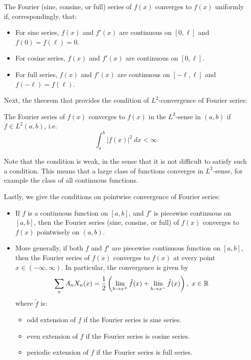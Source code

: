 \medskip 

\begin{thm} 
    The Fourier (sine, consine, or full) series of $f(x)$ converges to $f(x)$ uniformly if, correspondingly, that:
    \begin{itemize}
        \item For sine series, $f(x)$ and $f'(x)$ are continuous on $[0,\ell]$ and $f(0)= f(\ell)=0$.
        \item For cosine series, $f(x)$ and $f'(x)$ are continuous on $[0,\ell]$.
        \item For full series, $f(x)$ and $f'(x)$ are continuous on $[-\ell, \ell]$ and $f(-\ell) = f(\ell)$.
    \end{itemize}
\end{thm}

Next, the theorem that provides the condition of $L^2$-convergence of Fourier series:

\medskip 

\begin{thm} 
    The Fourier series of $f(x)$ converges to $f(x)$ in the $L^2$-sense in $(a,b)$ if $f\in L^2(a,b)$, i.e.
    \[\int_{a}^{b} |f(x)|^2\ dx < \infty\]
\end{thm}
Note that the condition is weak, in the sense that it is not difficult to satisfy such a condition. This means that a large class of functions converges in $L^2$-sense, for example the class of all continuous functions. 

Lastly, we give the conditions on pointwise convergence of Fourier series:

\medskip 

\begin{thm}  \hfill 
    \begin{itemize}
        \item If $f$ is a continuous function on $[a,b]$, and $f'$ is piecewise continuous on $[a,b]$, then the Fourier series (sine, consine, or full) of $f(x)$ converges to $f(x)$ pointwisely on $(a,b)$.
        \item More generally, if both $f$ and $f'$ are piecewise continuous function on $[a,b]$, then the Fourier series of $f(x)$ converges to $f(x)$ at every point $x\in (-\infty, \infty)$. In particular, the convergence is given by 
            \[\sum_n A_nX_n(x) = \frac{1}{2}\left(\lim_{h\to x^+}\tilde f(x) + \lim_{h\to x^-}\tilde f(x)\right),\ x\in {\mathbb R}\]
        where $\tilde f$ is:
        \begin{itemize}
            \item odd extension of $f$ if the Fourier series is sine series.
            \item even extension of $f$ if the Fourier series is cosine series.
            \item periodic extension of $f$ if the Fourier series is full series.
        \end{itemize}
    \end{itemize}
\end{thm}